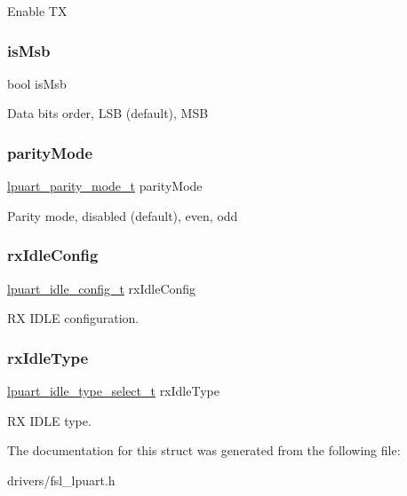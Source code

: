 Enable TX \mbox{\label{struct__lpuart__config_af9f7a36013824eebc7fc6c7d646f42ce}} 
\subsubsection{\texorpdfstring{isMsb}{isMsb}}
{\footnotesize\ttfamily bool is\+Msb}

Data bits order, L\+SB (default), M\+SB \mbox{\label{struct__lpuart__config_a12a3b03bf71728c9d45a5c5c59bdcf94}} 
\subsubsection{\texorpdfstring{parityMode}{parityMode}}
{\footnotesize\ttfamily \mbox{\hyperlink{group__lpuart__driver_gab5b7fa64ce57a2f68327e745f4a3e0b2}{lpuart\+\_\+parity\+\_\+mode\+\_\+t}} parity\+Mode}

Parity mode, disabled (default), even, odd \mbox{\label{struct__lpuart__config_a953abaccde778e491905c7d37a3e1bed}} 
\subsubsection{\texorpdfstring{rxIdleConfig}{rxIdleConfig}}
{\footnotesize\ttfamily \mbox{\hyperlink{group__lpuart__driver_ga48780347b56ffcf164d92df6957c8ab4}{lpuart\+\_\+idle\+\_\+config\+\_\+t}} rx\+Idle\+Config}

RX I\+D\+LE configuration. \mbox{\label{struct__lpuart__config_a71988980c7d5972f2ff951ef1e37eb78}} 
\subsubsection{\texorpdfstring{rxIdleType}{rxIdleType}}
{\footnotesize\ttfamily \mbox{\hyperlink{group__lpuart__driver_gad2f95b94d8a055a75e2099e11df4aece}{lpuart\+\_\+idle\+\_\+type\+\_\+select\+\_\+t}} rx\+Idle\+Type}

RX I\+D\+LE type. 

The documentation for this struct was generated from the following file\+:\begin{DoxyCompactItemize}
\item 
drivers/fsl\+\_\+lpuart.\+h\end{DoxyCompactItemize}
